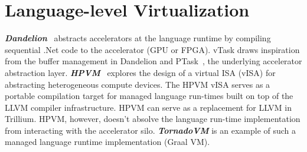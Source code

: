 \section{Language-level Virtualization}
\textbf{\textit{Dandelion}}~\cite{dandelion} abstracts accelerators at the
language runtime by compiling sequential .Net code to the accelerator
(GPU or FPGA). vTask draws inspiration from the buffer management in Dandelion
and PTask~\cite{rossbach2011ptask}, the underlying accelerator abstraction
layer.
\textbf{\textit{HPVM}}~\cite{HPVM} explores the design of a virtual ISA
(vISA) for abstracting heterogeneous compute devices. The HPVM vISA serves as
a portable compilation target for managed language run-times built on top of
the LLVM compiler infrastructure. HPVM can serve as a replacement for LLVM in
Trillium. HPVM, however, doesn't absolve the language run-time implementation
from interacting with the accelerator silo. \textbf{\textit{TornadoVM}} is an
example of such a managed language runtime implementation (Graal VM).